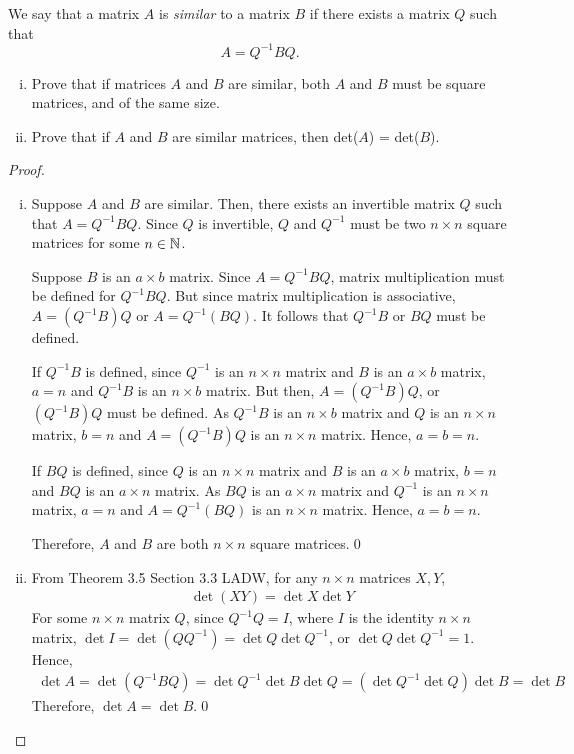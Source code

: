\begin{question}
	\normalfont We say that a matrix $A$ is \emph{similar} to a matrix $B$ if there exists a matrix $Q$ such that 
	\[
	A = Q^{-1}BQ.
	\]
	\begin{enumerate}[(i)]
	\item Prove that if matrices $A$ and $B$ are similar, both $A$ and $B$ must be square matrices, and of the same size. 
	\vspace{.1cm}	
\item	Prove that if $A$ and $B$ are similar matrices, then det($A$) = det($B$). 
	\end{enumerate}	
	\end{question}
\begin{proof}
	\renewcommand{\qedsymbol}{$\blacksquare$}
	\begin{enumerate}[(i)]
		\item Suppose $A$ and $B$ are similar.
		Then, there exists an invertible matrix $Q$ such that $A=Q^{-1}BQ$.
		Since $Q$ is invertible, $Q$ and $Q^{-1}$ must be two $n\times n$ square matrices for some $n\in\mathbb N$.
        
		Suppose $B$ is an $a\times b$ matrix.
        Since $A=Q^{-1}BQ$, matrix multiplication must be defined for $Q^{-1}BQ$.
        But since matrix multiplication is associative, $A=(Q^{-1}B)Q$ or $A=Q^{-1}(BQ)$.
        It follows that $Q^{-1}B$ or $BQ$ must be defined.

        If $Q^{-1}B$ is defined, since $Q^{-1}$ is an $n\times n$ matrix and $B$ is an $a\times b$ matrix, $a=n$ and $Q^{-1}B$ is an $n\times b$ matrix.
        But then, $A=(Q^{-1}B)Q$, or $(Q^{-1}B)Q$ must be defined.
        As $Q^{-1}B$ is an $n\times b$ matrix and $Q$ is an $n\times n$ matrix, $b=n$ and $A=(Q^{-1}B)Q$ is an $n\times n$ matrix.
        Hence, $a=b=n$.

        If $BQ$ is defined, since $Q$ is an $n\times n$ matrix and $B$ is an $a\times b$ matrix, $b=n$ and $BQ$ is an $a\times n$ matrix.
        As $BQ$ is an $a\times n$ matrix and $Q^{-1}$ is an $n\times n$ matrix, $a=n$ and $A=Q^{-1}(BQ)$ is an $n\times n$ matrix.
        Hence, $a=b=n$.

        Therefore, $A$ and $B$ are both $n\times n$ square matrices.\qed
        \item From Theorem 3.5 Section 3.3 LADW, for any $n\times n$ matrices $X,Y$,
        \[
            \begin{aligned}
                \det(XY)=\det X\det Y
            \end{aligned}
        \]
        For some $n\times n$ matrix $Q$, since $Q^{-1}Q=I$, where $I$ is the identity $n\times n$ matrix, $\det I=\det(QQ^{-1})=\det Q\det Q^{-1}$, or $\det Q\det Q^{-1}=1$.
        Hence, 
        \[
            \begin{aligned}
                \det A=\det(Q^{-1}BQ)=\det Q^{-1}\det B\det Q=(\det Q^{-1}\det Q)\det B=\det B
            \end{aligned}
        \]
        Therefore, $\det A=\det B$.\qed
     	\end{enumerate}
	\renewcommand{\qedsymbol}{}
\end{proof}
